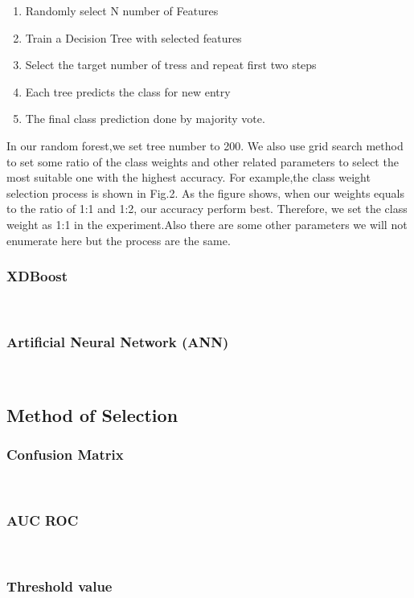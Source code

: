 \begin{enumerate}
    \item Randomly select N number of Features
    \item Train a Decision Tree with selected features
    \item Select the target number of tress and repeat first two steps 
    \item Each tree predicts the class for new entry
    \item The final class prediction done by majority vote. 
\end{enumerate}

In our random forest,we set tree number to 200. We also use grid search method to set some ratio of the class weights and other related parameters to select the most suitable one with the highest accuracy. For example,the class weight selection process is shown in Fig.2. As the figure shows, when our weights equals to the ratio of 1:1 and 1:2, our accuracy perform best. Therefore, we set the class weight as 1:1 in the experiment.Also there are some other parameters we will not enumerate here but the process are the same. 

\subsubsection{XDBoost}\hspace*{\fill} \\
\subsubsection{Artificial Neural Network (ANN)}\hspace*{\fill} \\




\subsection{Method of Selection}
\subsubsection{Confusion Matrix}\hspace*{\fill} \\
\subsubsection{AUC ROC}\hspace*{\fill} \\
\subsubsection{Threshold value}\hspace*{\fill} \\
